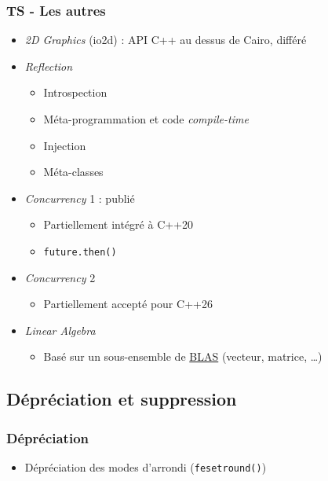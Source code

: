 \documentclass[C++.tex]{subfiles}
\begin{document}
\begin{frame}[fragile]
	\frametitle{TS - Les autres}
	\begin{itemize}
		\item \textit{2D Graphics} (io2d) : API C++ au dessus de Cairo, différé


		\item \textit{Reflection}
		\begin{itemize}
			\item Introspection
			\item Méta-programmation et code \textit{compile-time}
			\item Injection
			\item Méta-classes
		\end{itemize}


		\item \textit{Concurrency} 1 : publié
		\begin{itemize}
			\item Partiellement intégré à C++20
			\item \lstinline|future.then()|
		\end{itemize}
		\item \textit{Concurrency} 2
		\begin{itemize}
			\item Partiellement accepté pour C++26
		\end{itemize}
		\item \textit{Linear Algebra}
			\begin{itemize}
				\item Basé sur un sous-ensemble de \href{https://www.netlib.org/blas/}{BLAS} (vecteur, matrice, \ldots{})
			\end{itemize}
	\end{itemize}
\end{frame}

\subsection*{Dépréciation et suppression}
\begin{frame}[fragile]
	\frametitle{Dépréciation}
	\begin{itemize}
		\item Dépréciation des modes d'arrondi (\lstinline|fesetround()|)
	\end{itemize}
\end{frame}
\end{document}
